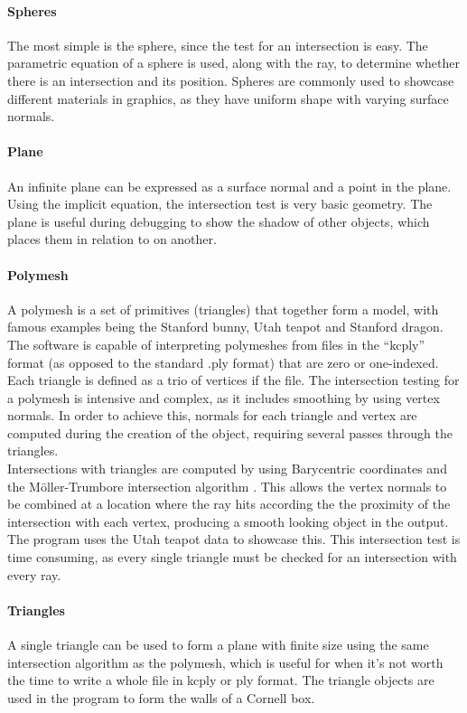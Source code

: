 \documentclass[a4paper]{article}
\begin{document}
\paragraph{Spheres} The most simple is the sphere, since the test for an intersection is easy. The parametric equation of a sphere is used, along with the ray, to determine whether there is an intersection and its position. Spheres are commonly used to showcase different materials in graphics, as they have uniform shape with varying surface normals.

\paragraph{Plane} An infinite plane can be expressed as a surface normal and a point in the plane. Using the implicit equation, the intersection test is very basic geometry. The plane is useful during debugging to show the shadow of other objects, which places them in relation to on another.

\paragraph{Polymesh} A polymesh is a set of primitives (triangles) that together form a model, with famous examples being the Stanford bunny, Utah teapot and Stanford dragon. The software is capable of interpreting polymeshes from files in the ``kcply'' format (as opposed to the standard .ply format) that are zero or one-indexed. Each triangle is defined as a trio of vertices if the file. The intersection testing for a polymesh is intensive and complex, as it includes smoothing by using vertex normals. In order to achieve this, normals for each triangle and vertex are computed during the creation of the object, requiring several passes through the triangles.\\

Intersections with triangles are computed by using Barycentric coordinates and the M{\"o}ller-Trumbore intersection algorithm \cite{Moller1997mtalgo}. This allows the vertex normals to be combined at a location where the ray hits according the the proximity of the intersection with each vertex, producing a smooth looking object in the output. The program uses the Utah teapot data to showcase this. This intersection test is time consuming, as every single triangle must be checked for an intersection with every ray.

\paragraph{Triangles} A single triangle can be used to form a plane with finite size using the same intersection algorithm as the polymesh, which is useful for when it's not worth the time to write a whole file in kcply or ply format. The triangle objects are used in the program to form the walls of a Cornell box.
\end{document}
